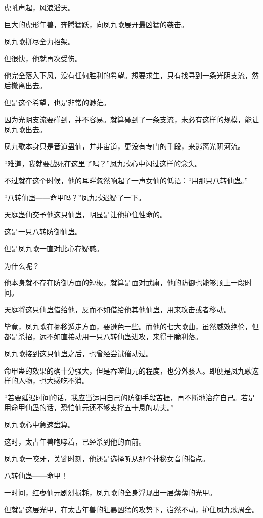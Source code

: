 \begin{this_body}
虎吼声起，风浪滔天。

巨大的虎形年兽，奔腾猛跃，向凤九歌展开最凶猛的袭击。

凤九歌拼尽全力招架。

但很快，他就再次受伤。

他完全落入下风，没有任何胜利的希望。想要求生，只有找寻到一条光阴支流，然后撤离出去。

但是这个希望，也是非常的渺茫。

因为光阴支流要碰到，并不容易。就算碰到了一条支流，未必有这样的规模，能让凤九歌出去。

凤九歌本身只是音道蛊仙，并非宙道，更没有专门的手段，来逃离光阴河流。

“难道，我就要战死在这里了吗？”凤九歌心中闪过这样的念头。

不过就在这个时候，他的耳畔忽然响起了一声女仙的低语：“用那只八转仙蛊。”

“八转仙蛊——命甲吗？”凤九歌迟疑了一下。

天庭蛊仙交予他这只仙蛊，明显是让他护住性命的。

这是一只八转防御仙蛊。

但是凤九歌一直对此心存疑惑。

为什么呢？

他本身就不存在防御方面的短板，就算是面对武庸，他的防御也能够顶上一段时间。

天庭将这只仙蛊借给他，反而不如借给他其他仙蛊，用来攻击或者移动。

毕竟，凤九歌在挪移遁走方面，要逊色一些。而他的七大歌曲，虽然威效绝伦，但都是杀招，远不如直接动用一只八转仙蛊进攻，来得干脆利落。

凤九歌接到这只仙蛊之后，也曾经尝试催动过。

命甲蛊的效果的确十分强大，但是吞噬仙元的程度，也分外骇人。即便是凤九歌这样的人物，也大感吃不消。

“若要延迟时间的话，我应当运用自己的防御手段苦捱，再不断地治疗自己。若是用命甲仙蛊的话，恐怕仙元还不够支撑五十息的功夫。”

凤九歌心中急速盘算。

这时，太古年兽咆哮着，已经杀到他的面前。

凤九歌一咬牙，关键时刻，他还是选择听从那个神秘女音的指点。

八转仙蛊——命甲！

一时间，红枣仙元剧烈损耗，凤九歌的全身浮现出一层薄薄的光甲。

但就是这层光甲，在太古年兽的狂暴凶猛的攻势下，岿然不动，护住凤九歌周全。


\end{this_body}
